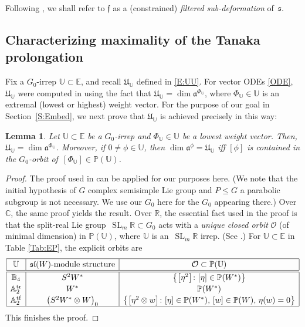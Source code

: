 \documentclass[10pt,a4paper]{amsart}
\newcommand\bbP{\mathbb{P}}
\DeclareMathOperator{\tf}{tf}
\DeclareMathOperator{\tr}{tr}
\newcommand\fa{\mathfrak{a}}
\newcommand\ff{\mathfrak{f}}
\newcommand\fs{\mathfrak{s}}
\newcommand\fsl{\mathfrak{sl}}
\newcommand\fU{\mathfrak{U}}
\newcommand{\R}{\mathbb{R}}
\newcommand{\C}{\mathbb{C}}
\newcommand\bbE{\mathbb{E}}
\newcommand\bbU{\mathbb{U}}
\newcommand\bbA{\mathbb{A}}
\newcommand\bbB{\mathbb{B}}
\newcommand\SL{\operatorname{SL}}
\newcommand\cO{\mathcal{O}}
\numberwithin{equation}{section}
\newtheorem{Lemma}[Theorem]{Lemma}
\begin{document}
Following \cite[Section~2.2]{The2021}, we shall refer to $\ff$ as a (constrained) {\em filtered sub-deformation} of~$\fs$.


\subsection{Characterizing maximality of the Tanaka prolongation}\label{S:BFT}

Fix a $G_0$-irrep $\bbU \subset \bbE$, and recall $\fU_\bbU$ defined in \eqref{E:UU}. For vector ODEs \eqref{ODE}, $\fU_\bbU$ were computed in \cite[Section~3.4]{KT2021} using the fact that $\fU_\bbU = \dim \fa^{\Phi_\bbU}$, where $\Phi_\bbU \in \bbU$ is an extremal (lowest or highest) weight vector. For the purpose of our goal in Section~\ref{S:Embed}, we next prove that $\fU_\bbU$ is achieved precisely in this way:

\begin{Lemma} \label{L: Max}
Let $\bbU \subset \bbE$ be a $G_0$-irrep and $\Phi_\bbU \in \bbU$ be a lowest weight vector. Then, $\fU_\bbU = \dim \fa^{\Phi_\bbU}$. Moreover, if $0 \neq \phi \in \bbU$, then $\dim \fa^\phi = \fU_\bbU$ iff $[\phi]$ is contained in the $G_0$-orbit of~${[\Phi_\bbU] \in \bbP(\bbU)}$.
\end{Lemma}

\begin{proof} The proof used in \cite[Proposition~3.1.1]{KT2017} can be applied for our purposes here. (We note that the initial hypothesis of $G$ complex semisimple Lie group and $P \leq G$ a parabolic subgroup is not necessary. We use our $G_0$ here for the $G_0$ appearing there.) Over $\C$, the same proof yields the result. Over $\R$, the essential fact used in the proof is that the split-real Lie group~$\SL_m\R \subset G_0$ acts with a {\em unique closed orbit} $\cO$ (of minimal dimension) in $\bbP(\bbU)$, where $\bbU$ is an~$\SL_m\R$ irrep. (See \cite[Corollary~1]{Winther2023}.) For $\bbU \subset \bbE$ in Table \ref{Tab:EP}, the explicit orbits are
 \[\renewcommand{\arraystretch}{1.15}
 \begin{array}{|c|c|c|} \hline
 \bbU & \fsl(W)\text{-module structure} & \cO \subset \bbP(\bbU)\\ \hline\hline
 \bbB_4 & S^2 W^* & \bigl\{ \big[\eta^2\big]\colon [\eta] \in \bbP(W^*) \bigr\}\\
 \bbA_2^{\tr} & W^* & \bbP(W^*) \\
 \bbA_2^{\tf} & \bigl(S^2 W^* \otimes W\bigr)_0 & \bigl\{ \big[\eta^2 \otimes w\big]\colon [\eta] \in \bbP(W^*),\, [w] \in \bbP(W),\, \eta(w) = 0 \bigr\}\\\hline
 \end{array}
 \]
This finishes the proof.
\end{proof}
\end{document}
